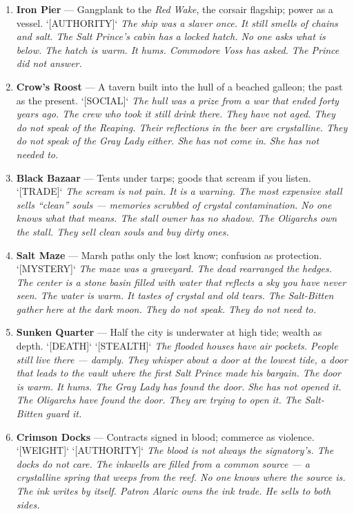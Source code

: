 \begin{enumerate}
\item \textbf{Iron Pier} --- Gangplank to the \textit{Red Wake}, the corsair flagship; power as a vessel. `[AUTHORITY]`
  \hfill \textit{The ship was a slaver once. It still smells of chains and salt. The Salt Prince's cabin has a locked hatch. No one asks what is below. The hatch is warm. It hums. Commodore Voss has asked. The Prince did not answer.}
\item \textbf{Crow's Roost} --- A tavern built into the hull of a beached galleon; the past as the present. `[SOCIAL]`
  \hfill \textit{The hull was a prize from a war that ended forty years ago. The crew who took it still drink there. They have not aged. They do not speak of the Reaping. Their reflections in the beer are crystalline. They do not speak of the Gray Lady either. She has not come in. She has not needed to.}
\item \textbf{Black Bazaar} --- Tents under tarps; goods that scream if you listen. `[TRADE]`
  \hfill \textit{The scream is not pain. It is a warning. The most expensive stall sells ``clean'' souls --- memories scrubbed of crystal contamination. No one knows what that means. The stall owner has no shadow. The Oligarchs own the stall. They sell clean souls and buy dirty ones.}
\item \textbf{Salt Maze} --- Marsh paths only the lost know; confusion as protection. `[MYSTERY]`
  \hfill \textit{The maze was a graveyard. The dead rearranged the hedges. The center is a stone basin filled with water that reflects a sky you have never seen. The water is warm. It tastes of crystal and old tears. The Salt-Bitten gather here at the dark moon. They do not speak. They do not need to.}
\item[J] \textbf{Sunken Quarter} --- Half the city is underwater at high tide; wealth as depth. `[DEATH]` `[STEALTH]`
  \hfill \textit{The flooded houses have air pockets. People still live there --- damply. They whisper about a door at the lowest tide, a door that leads to the vault where the first Salt Prince made his bargain. The door is warm. It hums. The Gray Lady has found the door. She has not opened it. The Oligarchs have found the door. They are trying to open it. The Salt-Bitten guard it.}
\item[Q] \textbf{Crimson Docks} --- Contracts signed in blood; commerce as violence. `[WEIGHT]` `[AUTHORITY]`
  \hfill \textit{The blood is not always the signatory's. The docks do not care. The inkwells are filled from a common source --- a crystalline spring that weeps from the reef. No one knows where the source is. The ink writes by itself. Patron Alaric owns the ink trade. He sells to both sides.}

\end{enumerate}
